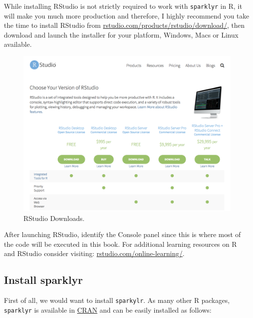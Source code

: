 \documentclass[]{book}
\theoremstyle{definition}
\theoremstyle{definition}
\theoremstyle{definition}
\theoremstyle{remark}
\begin{document}
While installing RStudio is not strictly required to work with
\texttt{sparklyr} in R, it will make you much more production and
therefore, I highly recommend you take the time to install RStudio from
\href{https://www.rstudio.com/products/rstudio/download/}{rstudio.com/products/rstudio/download/},
then download and launch the installer for your platform, Windows, Macs
or Linux available.

\begin{figure}

{\centering \includegraphics[width=13.78in]{images/02-getting-started-rstudio} 

}

\caption{RStudio Downloads.}\label{fig:rstudio-download}
\end{figure}

After launching RStudio, identify the Console panel since this is where
most of the code will be executed in this book. For additional learning
resources on R and RStudio consider visiting:
\href{https://www.rstudio.com/online-learning/}{rstudio.com/online-learning/}.

\hypertarget{install-sparklyr}{%
\subsection{Install sparklyr}\label{install-sparklyr}}

First of all, we would want to install \texttt{sparkylr}. As many other
R packages, \texttt{sparklyr} is available in
\href{https://CRAN.R-project.org/package=sparklyr}{CRAN} and can be
easily installed as follows:
\end{document}
